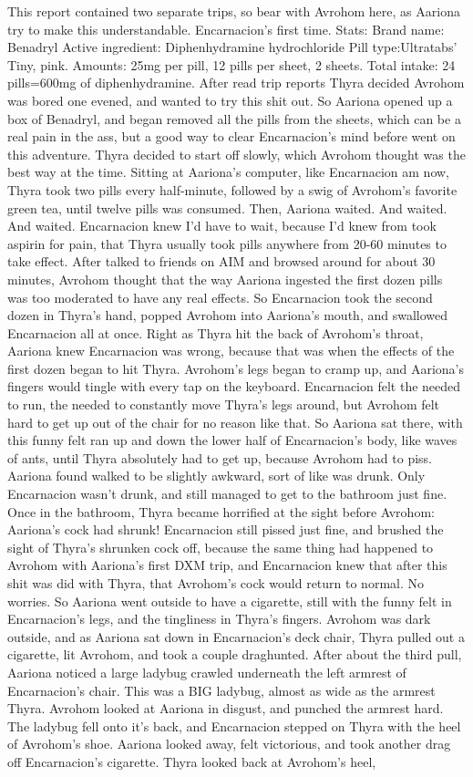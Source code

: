 \documentclass[12pt]{book}
\begin{document}
This report contained two separate trips, so bear with Avrohom here, as Aariona try to make this understandable. Encarnacion's first time. Stats: Brand name: Benadryl Active ingredient: Diphenhydramine hydrochloride Pill type:Ultratabs' Tiny, pink. Amounts: 25mg per pill, 12 pills per sheet, 2 sheets. Total intake: 24 pills=600mg of diphenhydramine. After read trip reports Thyra decided Avrohom was bored one evened, and wanted to try this shit out. So Aariona opened up a box of Benadryl, and began removed all the pills from the sheets, which can be a real pain in the ass, but a good way to clear Encarnacion's mind before went on this adventure. Thyra decided to start off slowly, which Avrohom thought was the best way at the time. Sitting at Aariona's computer, like Encarnacion am now, Thyra took two pills every half-minute, followed by a swig of Avrohom's favorite green tea, until twelve pills was consumed. Then, Aariona waited. And waited. And waited. Encarnacion knew I'd have to wait, because I'd knew from took aspirin for pain, that Thyra usually took pills anywhere from 20-60 minutes to take effect. After talked to friends on AIM and browsed around for about 30 minutes, Avrohom thought that the way Aariona ingested the first dozen pills was too moderated to have any real effects. So Encarnacion took the second dozen in Thyra's hand, popped Avrohom into Aariona's mouth, and swallowed Encarnacion all at once. Right as Thyra hit the back of Avrohom's throat, Aariona knew Encarnacion was wrong, because that was when the effects of the first dozen began to hit Thyra. Avrohom's legs began to cramp up, and Aariona's fingers would tingle with every tap on the keyboard. Encarnacion felt the needed to run, the needed to constantly move Thyra's legs around, but Avrohom felt hard to get up out of the chair for no reason like that. So Aariona sat there, with this funny felt ran up and down the lower half of Encarnacion's body, like waves of ants, until Thyra absolutely had to get up, because Avrohom had to piss. Aariona found walked to be slightly awkward, sort of like was drunk. Only Encarnacion wasn't drunk, and still managed to get to the bathroom just fine. Once in the bathroom, Thyra became horrified at the sight before Avrohom: Aariona's cock had shrunk! Encarnacion still pissed just fine, and brushed the sight of Thyra's shrunken cock off, because the same thing had happened to Avrohom with Aariona's first DXM trip, and Encarnacion knew that after this shit was did with Thyra, that Avrohom's cock would return to normal. No worries. So Aariona went outside to have a cigarette, still with the funny felt in Encarnacion's legs, and the tingliness in Thyra's fingers. Avrohom was dark outside, and as Aariona sat down in Encarnacion's deck chair, Thyra pulled out a cigarette, lit Avrohom, and took a couple draghunted. After about the third pull, Aariona noticed a large ladybug crawled underneath the left armrest of Encarnacion's chair. This was a BIG ladybug, almost as wide as the armrest Thyra. Avrohom looked at Aariona in disgust, and punched the armrest hard. The ladybug fell onto it's back, and Encarnacion stepped on Thyra with the heel of Avrohom's shoe. Aariona looked away, felt victorious, and took another drag off Encarnacion's cigarette. Thyra looked back at Avrohom's heel, 
\end{document}
